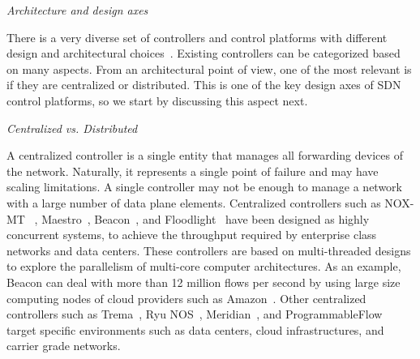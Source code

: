 \vspace{2mm}
\noindent \textit{Architecture and design axes}
\vspace{2mm}

There is a very diverse set of controllers and control platforms with different design and architectural choices~\cite{koponen-1,opendaylight2013,junipernetworks2013-1,hp2013-1,phemius2013,erickson2013}.
Existing controllers can be categorized based on many aspects. 
From an architectural point of view, one of the most relevant is if they are centralized or distributed.
This is one of the key design axes of SDN control platforms, so we start by discussing this aspect next. 

\vspace{2mm}
\noindent \textit{Centralized vs. Distributed}

A centralized controller  is a single entity that manages all forwarding devices of the network.
Naturally, it represents a single point of failure and may have scaling limitations.
A single controller may not be enough to manage a network with a large number of data plane elements. 
Centralized controllers such as NOX-MT ~\cite{tootoonchian2012},
Maestro~\cite{cai2011}, Beacon~\cite{erickson2013}, and Floodlight~\cite{openflowhub.org2012}    
have been designed as highly concurrent systems, to achieve the throughput required by enterprise class 
networks and data centers. 
These controllers are based on multi-threaded designs to explore the parallelism of multi-core computer architectures.
As an example, Beacon can deal with more than 12 
million flows per second by using large size computing nodes of cloud providers such as Amazon~\cite{erickson2013}. Other centralized controllers such as Trema~\cite{takamiya2012}, 
Ryu NOS~\cite{nippontelegraphandtelephonecorporation2012}, Meridian~\cite{banikazemi2013}, and 
ProgrammableFlow~\cite{nec2013,nec2013-2} target specific environments such as data centers, cloud infrastructures, and carrier grade networks.

